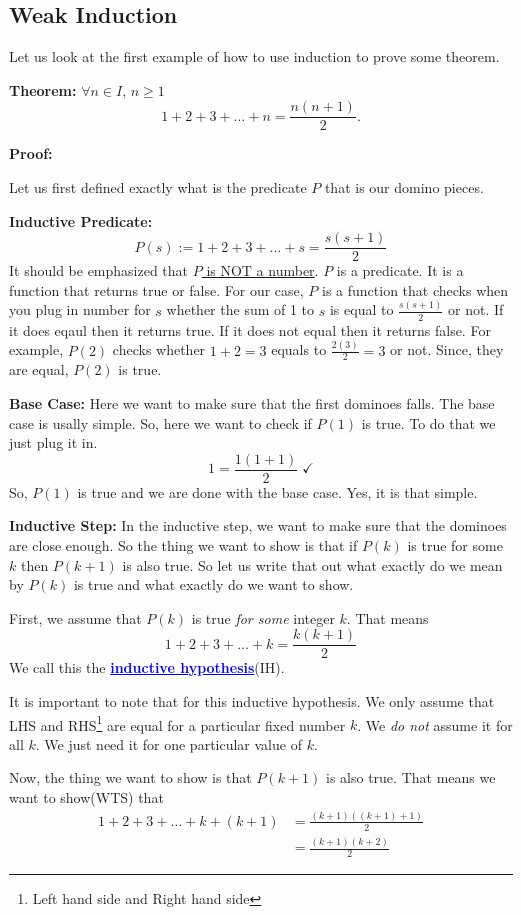 \documentclass[a4paper, 12pt]{article}
\newcommand{\theorem}{\noindent\textbf{Theorem:} }
\newcommand{\predicate}{\noindent\textbf{Inductive Predicate:} }
\newcommand{\inductivestep}{\noindent\textbf{Inductive Step:} }
\renewcommand{\proof}{\noindent\textbf{Proof:} }
\newcommand{\basecase}{\noindent\textbf{Base Case:} }
\newcommand{\kwd}[1]{\textcolor{blue}{\textbf{\underline{#1}}}}
\theoremstyle{examplestyle}
\begin{document}
\begin{multicols}{2}
\section*{Weak Induction}

Let us look at the first example of how to use induction to prove some theorem.

\theorem $\forall n \in I$, $n\ge 1$
\[
	1+2+3+ \ldots + n = \frac{n(n+1)}{2}.
\]

\proof 

Let us first defined exactly what is the predicate $P$ that is our domino pieces.
\newline

\predicate
\[
	P(s) := 1 + 2 + 3 + \ldots +s = \frac{s(s+1)}{2}
\]
It should be emphasized that \underline{$P$ is NOT a number}. $P$ is a predicate. It is a function that returns true or false. For our case, $P$ is a function that checks when you plug in number for $s$ whether the sum of 1 to $s$ is equal to $\frac{s(s+1)}{2}$ or not. If it does eqaul then it returns true. If it does not equal then it returns false. For example, $P(2)$ checks whether $1+2=3$ equals to $\frac{2(3)}{2} = 3$ or not. Since, they are equal, $P(2)$ is true.
\newline

\basecase Here we want to make sure that the first dominoes falls. The base case is usally simple. So, here we want to check if $P(1)$ is true. To do that we just plug it in.
\[
	1 = \frac{1(1+1)}{2}\;\checkmark
\]
 So, $P(1)$ is true and we are done with the base case. Yes, it is that simple.
 \newline
 
\inductivestep In the inductive step, we want to make sure that the dominoes are close enough. So the thing we want to show is that if $P(k)$ is true for some $k$ then $P(k+1)$ is also true. So let us write that out what exactly do we mean by $P(k)$ is true and what exactly do we want to show.

First, we assume that $P(k)$ is true \emph{for some} integer $k$. That means
\[
	1 + 2 + 3 + \ldots + k = \frac{k(k+1)}{2}
\]
We call this the \kwd{inductive hypothesis}(IH).

It is important to note that for this inductive hypothesis. We only assume that LHS and RHS\footnote{Left hand side and Right hand side} are equal for a particular fixed number $k$. We \emph{do not} assume it for all $k$. We just need it for one particular value of $k$.

Now, the thing we want to show is that $P(k+1)$ is also true. That means we want to show(WTS) that
\begin{align}
1 + 2 + 3 + \ldots + k + (k+1) &= \frac{(k+1)((k+1)+1)}{2}\\
&=\frac{(k+1)(k+2)}{2}
\label{eq:wts1}
\end{align}


\end{multicols}
\end{document}
